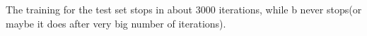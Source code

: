 \begin{answer}
The training for the test set stops in about 3000 iterations, while b never stops(or maybe it does after very big number of iterations).
\end{answer}
